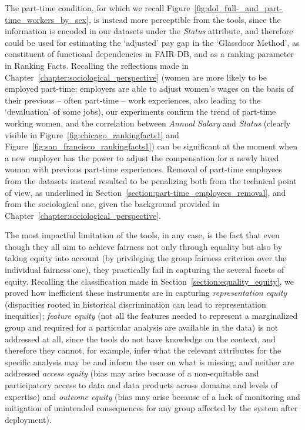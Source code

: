 The part-time condition, for which we recall Figure~\ref{fig:dol_full-_and_part-time_workers_by_sex}, is instead more perceptible from the tools, since the information is encoded in our datasets under the \textit{Status} attribute, and therefore could be used for estimating the `adjusted' pay gap in the `Glassdoor Method', as constituent of functional dependencies in FAIR-DB, and as a ranking parameter in Ranking Facts. Recalling the reflections made in Chapter~\ref{chapter:sociological_perspective} (women are more likely to be employed part-time; employers are able to adjust women's wages on the basis of their previous -- often part-time -- work experiences, also leading to the `devaluation' of some jobs), our experiments confirm the trend of part-time working women, and the correlation between \textit{Annual Salary} and \textit{Status} (clearly visible in Figure~\ref{fig:chicago_rankingfacts1} and Figure~\ref{fig:san_francisco_rankingfacts1}) can be significant at the moment when a new employer has the power to adjust the compensation for a newly hired woman with previous part-time experiences.
Removal of part-time employees from the datasets instead resulted to be penalizing both from the technical point of view, as underlined in Section~\ref{section:part-time_employees_removal}, and from the sociological one, given the background provided in Chapter~\ref{chapter:sociological_perspective}.

The most impactful limitation of the tools, in any case, is the fact that even though they all aim to achieve fairness not only through equality but also by taking equity into account (by privileging the group fairness criterion over the individual fairness one), they practically fail in capturing the several facets of equity. Recalling the classification made in Section~\ref{section:equality_equity}, we proved how inefficient these instruments are in capturing \textit{representation equity} (disparities rooted in historical discrimination can lead to representation inequities); \textit{feature equity} (not all the features needed to represent a marginalized group and required for a particular analysis are available in the data) is not addressed at all, since the tools do not have knowledge on the context, and therefore they cannot, for example, infer what the relevant attributes for the specific analysis may be and inform the user on what is missing; and neither are addressed \textit{access equity} (bias may arise because of a non-equitable and participatory access to data and data products across domains and levels of expertise) and \textit{outcome equity} (bias may arise because of a lack of monitoring and mitigation of unintended consequences for any group affected by the system after deployment).

